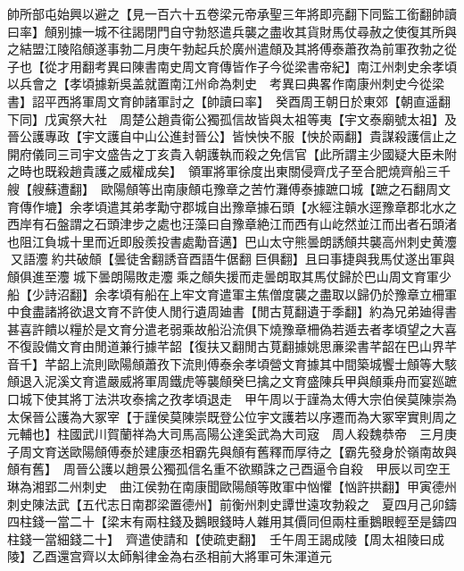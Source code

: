 帥所部屯始興以避之【見一百六十五卷梁元帝承聖三年將即亮翻下同監工銜翻帥讀曰率】頠别據一城不往謁閉門自守勃怒遣兵襲之盡收其貨財馬仗尋赦之使復其所與之結盟江陵陷頠遂事勃二月庚午勃起兵於廣州遣頠及其將傅泰蕭孜為前軍孜勃之從子也【從才用翻考異曰陳書南史周文育傳皆作子今從梁書帝紀】南江州刺史余孝頃以兵會之【孝頃據新吳盖就置南江州命為刺史　考異曰典畧作南康州刺史今從梁書】詔平西將軍周文育帥諸軍討之【帥讀曰率】　癸酉周王朝日於東郊【朝直遥翻下同】戊寅祭大社　周楚公趙貴衛公獨孤信故皆與太祖等夷【宇文泰廟號太祖】及晉公護專政【宇文護自中山公進封晉公】皆怏怏不服【怏於兩翻】貴謀殺護信止之開府儀同三司宇文盛告之丁亥貴入朝護執而殺之免信官【此所謂主少國疑大臣未附之時也既殺趙貴護之威權成矣】　領軍將軍徐度出東關侵齊戊子至合肥燒齊船三千艘【艘蘇遭翻】　歐陽頠等出南康頠屯豫章之苦竹灘傅泰據蹠口城【蹠之石翻周文育傳作塶】余孝頃遣其弟孝勱守郡城自出豫章據石頭【水經注贑水逕豫章郡北水之西岸有石盤謂之石頭津步之處也汪藻曰自豫章絶江而西有山屹然並江而出者石頭渚也阻江負城十里而近即殷羨投書處勱音邁】巴山太守熊曇朗誘頠共襲高州刺史黄灋又語灋約共破頠【曇徒舍翻誘音酉語牛倨翻巨俱翻】且曰事捷與我馬仗遂出軍與頠俱進至灋城下曇朗陽敗走灋乘之頠失援而走曇朗取其馬仗歸於巴山周文育軍少船【少詩沼翻】余孝頃有船在上牢文育遣軍主焦僧度襲之盡取以歸仍於豫章立柵軍中食盡諸將欲退文育不許使人閒行遺周廸書【閒古莧翻遺于季翻】約為兄弟廸得書甚喜許饋以糧於是文育分遣老弱乘故船沿流俱下燒豫章柵偽若遁去者孝頃望之大喜不復設備文育由閒道兼行據芊韶【復扶又翻閒古莧翻據姚思亷梁書芊韶在巴山界芊音千】芊韶上流則歐陽頠蕭孜下流則傅泰余孝頃營文育據其中間築城饗士頠等大駭頠退入泥溪文育遣嚴威將軍周鐵虎等襲頠癸巳擒之文育盛陳兵甲與頠乘舟而宴廵蹠口城下使其將丁法洪攻泰擒之孜孝頃退走　甲午周以于謹為太傅大宗伯侯莫陳崇為太保晉公護為大冢宰【于謹侯莫陳崇既登公位宇文護若以序遷而為大冢宰實則周之元輔也】柱國武川賀蘭祥為大司馬高陽公達奚武為大司宼　周人殺魏恭帝　三月庚子周文育送歐陽頠傅泰於建康丞相霸先與頠有舊釋而厚待之【霸先發身於嶺南故與頠有舊】　周晉公護以趙景公獨孤信名重不欲顯誅之己酉逼令自殺　甲辰以司空王琳為湘郢二州刺史　曲江侯勃在南康聞歐陽頠等敗軍中忷懼【忷許拱翻】甲寅德州刺史陳法武【五代志日南郡梁置德州】前衡州刺史譚世遠攻勃殺之　夏四月己卯鑄四柱錢一當二十【梁末有兩柱錢及鵝眼錢時人雜用其價同但兩柱重鵝眼輕至是鑄四柱錢一當細錢二十】　齊遣使請和【使疏吏翻】　壬午周王謁成陵【周太祖陵曰成陵】乙酉還宫齊以太師斛律金為右丞相前大將軍可朱渾道元

